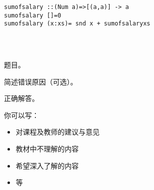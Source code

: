 \documentclass[11pt, a4paper, UTF8]{ctexart}
\begin{document}
\begin{solution}
\begin{verbatim}
sumofsalary ::(Num a)=>[(a,a)] -> a
sumofsalary []=0
sumofsalary (x:xs)= snd x + sumofsalaryxs




\end{verbatim}
\end{solution}





\begincorrection	%

\begin{problem}[题号]
  题目。
\end{problem}

\begin{cause}
  简述错误原因（可选）。
\end{cause}

\begin{revision}
  正确解答。
\end{revision}
\beginfb	%

你可以写：
\begin{itemize}
  \item 对课程及教师的建议与意见
  \item 教材中不理解的内容
  \item 希望深入了解的内容
  \item 等
\end{itemize}
\end{document}
